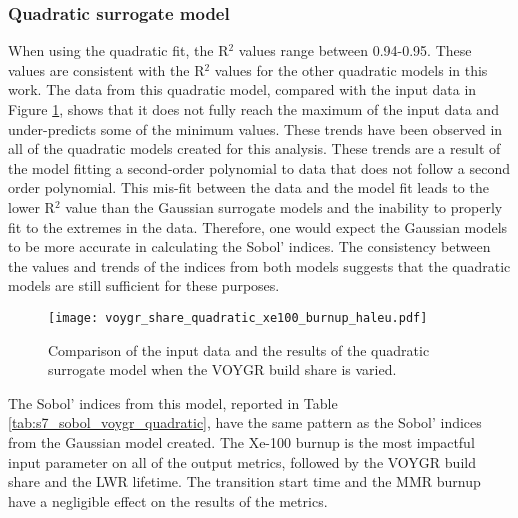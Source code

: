 \subsubsection{Quadratic surrogate model}
When using the quadratic fit, the R$^2$ values range between 0.94-0.95. 
These values are consistent with the R$^2$ values for the other 
quadratic models in this work. The data from this quadratic model,
compared with the input data in Figure \ref{fig:s7_voygr_quadratic}, 
shows that it does not fully reach the maximum of the input data
and under-predicts some of the minimum values. These trends have 
been observed in all of the quadratic models created for this analysis. 
These trends are a result of the model fitting a second-order 
polynomial to data that does not follow a second order polynomial. This 
mis-fit between the data and the model fit leads to the lower R$^2$ value 
than the Gaussian surrogate models and the inability to properly fit 
to the extremes in the data. Therefore, one would expect the 
Gaussian models to be more accurate in calculating the Sobol' 
indices. The consistency between the values and trends of the 
indices from both models suggests that the quadratic models are 
still sufficient for these purposes. 

\begin{figure}[h!]
    \centering 
    \texttt{[image: voygr\_share\_quadratic\_xe100\_burnup\_haleu.pdf]}
    \caption{Comparison of the input data and the results of the quadratic 
    surrogate model when the VOYGR build share is varied.}
    \label{fig:s7_voygr_quadratic}
\end{figure}

The Sobol' indices from this model, reported in Table 
\ref{tab:s7_sobol_voygr_quadratic},
have the same pattern as the Sobol' indices from the Gaussian model created. 
The Xe-100 burnup is the most impactful input parameter on all of the 
output metrics, followed by the VOYGR build share and the \gls{LWR} lifetime. 
The transition start time and the \gls{MMR} burnup have a negligible effect 
on the results of the metrics. 

